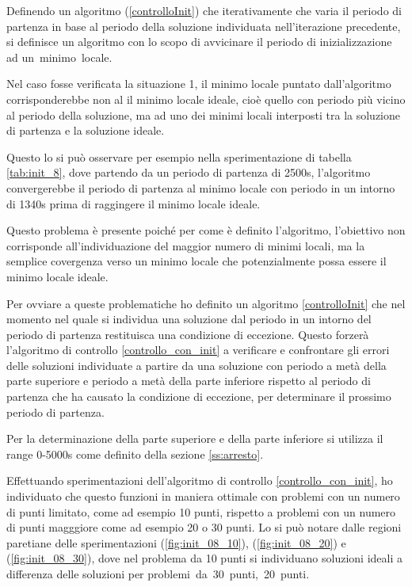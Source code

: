 \documentclass[a4paper,12pt]{report}
\begin{document}
Definendo un algoritmo (\ref{controlloInit}) che iterativamente che varia il periodo di partenza in base al periodo della soluzione individuata nell'iterazione precedente, si definisce un algoritmo con lo scopo di avvicinare il periodo di inizializzazione ad un~minimo~locale.

Nel caso fosse verificata la situazione 1, il minimo locale puntato dall'algoritmo corrisponderebbe non al il minimo locale ideale, cioè quello con periodo più vicino al periodo della soluzione, ma ad uno dei minimi locali interposti tra la soluzione di partenza e la soluzione ideale.

Questo lo si può osservare per esempio nella sperimentazione di tabella \ref{tab:init_8}, dove partendo da un periodo di partenza di 2500s, l'algoritmo convergerebbe il periodo di partenza al minimo locale con periodo in un intorno di 1340s prima di raggingere il minimo locale ideale.

Questo problema è presente poiché per come è definito l'algoritmo, l'obiettivo non corrisponde all'individuazione del maggior numero di minimi locali, ma la semplice covergenza verso un minimo locale che potenzialmente possa essere il minimo locale ideale.

Per ovviare a queste problematiche ho definito un algoritmo \ref{controlloInit} che nel momento nel quale si individua una soluzione dal periodo in un intorno del periodo di partenza restituisca una condizione di eccezione.
Questo forzerà l'algoritmo di controllo \ref{controllo_con_init} a verificare e confrontare gli errori delle soluzioni individuate a partire da una soluzione con periodo a metà della parte superiore e periodo a metà della parte inferiore rispetto al periodo di partenza che ha causato la condizione di eccezione, per determinare il prossimo periodo di partenza.

Per la determinazione della parte superiore e della parte inferiore si utilizza il range 0-5000s come definito della sezione \ref{ss:arresto}.

Effettuando sperimentazioni dell'algoritmo di controllo \ref{controllo_con_init}, ho individuato che questo funzioni in maniera ottimale con problemi con un numero di punti limitato, come ad esempio 10 punti, rispetto a problemi con un numero di punti magggiore come ad esempio 20 o 30 punti. Lo si può notare dalle regioni paretiane delle sperimentazioni (\ref{fig:init_08_10}), (\ref{fig:init_08_20}) e  (\ref{fig:init_08_30}), dove nel problema da 10 punti si individuano soluzioni ideali a differenza delle soluzioni per problemi~da~30~punti,~20~punti.
\end{document}
